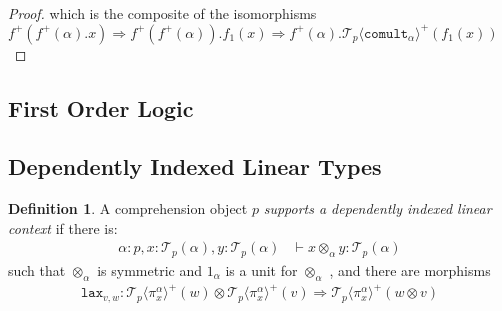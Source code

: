 \documentclass[10pt]{article}
\theoremstyle{definition}
\newtheorem{definition}{Definition}
\newcommand{\yields}{\vdash}
\newcommand{\tcell}{\Rightarrow}
\newcommand{\id}{\mathsf{id}}
\newcommand\TrPlus[2]{\ensuremath{{#1}^+(#2)}}
\newcommand\El[2]{\mathcal{T}_{#1}(#2)}
\newcommand\ApEl[2]{\mathcal{T}_{#1}\langle#2\rangle}
\newcommand\bdot[0]{\mathbin{.}}
\newcommand\ap[2]{\ensuremath{#1 \langle #2 \rangle }}
\newcommand\ApPlus[2]{\ensuremath{{#1}^+ \langle #2 \rangle }}
\newcommand{\tdot}{\ensuremath{\mathtt{dot}}}
\newcommand\var[1]{\ensuremath{\mathtt{var}_{#1}}}
\newcommand\fone[1]{\ensuremath{\mathtt{fone}_{#1}}}
\newcommand\fcomult[1]{\ensuremath{\mathtt{comult}_{#1}}}
\newcommand\fcounit[1]{\ensuremath{\mathtt{counit}_{#1}}}
\begin{document}
\begin{proof}
which is the composite of the isomorphisms $\TrPlus{f}{\TrPlus{f}{\alpha}.x} \tcell \TrPlus{f}{\TrPlus{f}{\alpha}}.f_1(x) \tcell \TrPlus{f}{\alpha}.\TrPlus{\ApEl{p}{\fcomult{\alpha}}}{f_1(x)}$
\end{proof}

\subsection{First Order Logic}

\subsection{Dependently Indexed Linear Types}


\begin{definition}
A comprehension object $p$ \emph{supports a dependently indexed linear context} if there is:
\begin{align*}
\alpha : p, x : \El{p}{\alpha}, y : \El{p}{\alpha} &\yields x \otimes_\alpha y : \El{p}{\alpha}
\end{align*}
such that $\otimes_\alpha$ is symmetric and $1_\alpha$ is a unit for $\otimes_\alpha$ ,  and there are morphisms 
\begin{align*}
\mathtt{lax}_{v,w} : \TrPlus{\ApEl{p}{\pi^\alpha_x}}{w} \otimes \TrPlus{\ApEl{p}{\pi^\alpha_x}}{v} \tcell \TrPlus{\ApEl{p}{\pi^\alpha_x}}{w \otimes v}
\end{align*}
\end{definition}
\end{document}
